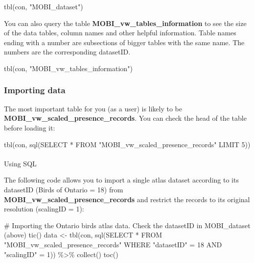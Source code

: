 \documentclass[
  letterpaper,
  DIV=11,
  numbers=noendperiod]{scrartcl}
\makeatletter
\let\oldparagraph\paragraph
\renewcommand{\paragraph}{
    \@ifstar
      \xxxParagraphStar
      \xxxParagraphNoStar
  }
\newcommand{\xxxParagraphStar}[1]{\oldparagraph*{#1}\mbox{}}
\newcommand{\xxxParagraphNoStar}[1]{\oldparagraph{#1}\mbox{}}
\newenvironment{Shaded}{\begin{snugshade}}{\end{snugshade}}
\newcommand{\CommentTok}[1]{\textcolor[rgb]{0.37,0.37,0.37}{#1}}
\newcommand{\FunctionTok}[1]{\textcolor[rgb]{0.28,0.35,0.67}{#1}}
\newcommand{\NormalTok}[1]{\textcolor[rgb]{0.00,0.23,0.31}{#1}}
\newcommand{\OtherTok}[1]{\textcolor[rgb]{0.00,0.23,0.31}{#1}}
\newcommand{\SpecialCharTok}[1]{\textcolor[rgb]{0.37,0.37,0.37}{#1}}
\newcommand{\StringTok}[1]{\textcolor[rgb]{0.13,0.47,0.30}{#1}}
\makeatother
\begin{document}
\begin{Shaded}
\begin{Highlighting}[]
\FunctionTok{tbl}\NormalTok{(con, }\StringTok{"MOBI\_dataset"}\NormalTok{)}
\end{Highlighting}
\end{Shaded}

You can also query the table \textbf{MOBI\_vw\_tables\_information} to
see the size of the data tables, column names and other helpful
information. Table names ending with a number are subsections of bigger
tables with the same name. The numbers are the corresponding datasetID.

\begin{Shaded}
\begin{Highlighting}[]
\FunctionTok{tbl}\NormalTok{(con, }\StringTok{"MOBI\_vw\_tables\_information"}\NormalTok{)}
\end{Highlighting}
\end{Shaded}

\subsubsection{Importing data}\label{importing-data}

The most important table for you (as a user) is likely to be
\textbf{MOBI\_vw\_scaled\_presence\_records}. You can check the head of
the table before loading it:

\begin{Shaded}
\begin{Highlighting}[]
\FunctionTok{tbl}\NormalTok{(con, }\FunctionTok{sql}\NormalTok{(}\StringTok{\textquotesingle{}SELECT * FROM "MOBI\_vw\_scaled\_presence\_records"}
\StringTok{             LIMIT 5\textquotesingle{}}\NormalTok{))}
\end{Highlighting}
\end{Shaded}

\paragraph{Using SQL}\label{using-sql}

The following code allows you to import a single atlas dataset according
to its datasetID (Birds of Ontario = 18) from
\textbf{MOBI\_vw\_scaled\_presence\_records} and restrict the records to
its original resolution (scalingID = 1):

\begin{Shaded}
\begin{Highlighting}[]
\CommentTok{\# Importing the Ontario birds atlas data. Check the datasetID in MOBI\_dataset (above)}
\FunctionTok{tic}\NormalTok{()}
\NormalTok{data }\OtherTok{\textless{}{-}} \FunctionTok{tbl}\NormalTok{(con, }\FunctionTok{sql}\NormalTok{(}\StringTok{\textquotesingle{}SELECT * FROM "MOBI\_vw\_scaled\_presence\_records"}
\StringTok{                     WHERE "datasetID" = 18}
\StringTok{                     AND "scalingID" = 1\textquotesingle{}}\NormalTok{)) }\SpecialCharTok{\%\textgreater{}\%}
  \FunctionTok{collect}\NormalTok{()}
\FunctionTok{toc}\NormalTok{()}
\end{Highlighting}
\end{Shaded}
\end{document}
